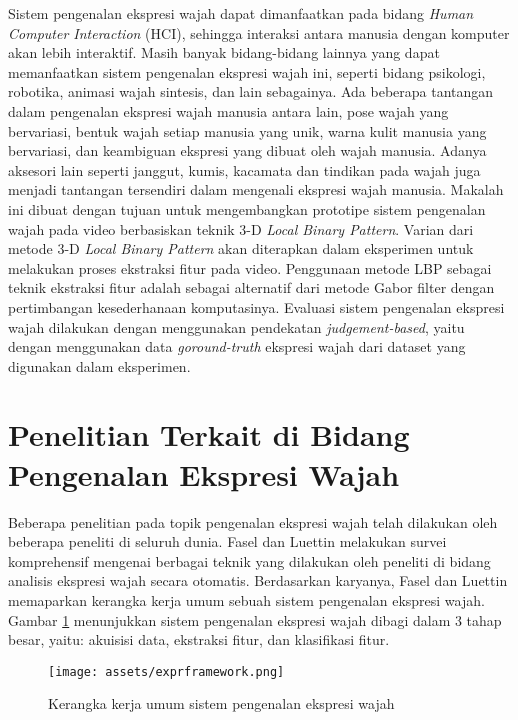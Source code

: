 \documentclass[review,3p,12pt,times]{elsarticle}
\begin{document}
Sistem pengenalan ekspresi wajah dapat dimanfaatkan pada bidang \textit{Human Computer Interaction} (HCI), sehingga interaksi antara manusia dengan komputer akan lebih interaktif. Masih banyak bidang-bidang lainnya yang dapat memanfaatkan sistem pengenalan ekspresi wajah ini, seperti bidang psikologi, robotika, animasi wajah sintesis, dan lain sebagainya. Ada beberapa tantangan dalam pengenalan ekspresi wajah manusia antara lain, pose wajah yang bervariasi, bentuk wajah setiap manusia yang unik, warna kulit manusia yang bervariasi, dan keambiguan ekspresi yang dibuat oleh wajah manusia. Adanya aksesori lain seperti janggut, kumis, kacamata dan tindikan pada wajah juga menjadi tantangan tersendiri dalam mengenali ekspresi wajah manusia. Makalah ini dibuat dengan tujuan untuk mengembangkan prototipe sistem pengenalan wajah pada video berbasiskan teknik 3-D \textit{Local Binary Pattern}. Varian dari metode 3-D \textit{Local Binary Pattern} akan diterapkan dalam eksperimen untuk melakukan proses ekstraksi fitur pada video. Penggunaan metode LBP sebagai teknik ekstraksi fitur adalah sebagai alternatif dari metode Gabor filter dengan pertimbangan kesederhanaan komputasinya. Evaluasi sistem pengenalan ekspresi wajah dilakukan dengan menggunakan pendekatan \textit{judgement-based}, yaitu dengan menggunakan data \textit{goround-truth} ekspresi wajah dari dataset yang digunakan dalam eksperimen.


\section{Penelitian Terkait di Bidang Pengenalan Ekspresi Wajah}
\label{related}

Beberapa penelitian pada topik pengenalan ekspresi wajah telah dilakukan oleh beberapa peneliti di seluruh dunia. Fasel dan Luettin \cite{fasel2003automatic} melakukan survei komprehensif mengenai berbagai teknik yang dilakukan oleh peneliti di bidang analisis ekspresi wajah secara otomatis. Berdasarkan karyanya, Fasel dan Luettin memaparkan kerangka kerja umum sebuah sistem pengenalan ekspresi wajah. Gambar \ref{fig:exprframework} menunjukkan sistem pengenalan ekspresi wajah dibagi dalam 3 tahap besar, yaitu: akuisisi data, ekstraksi fitur, dan klasifikasi fitur.

\begin{figure}[hbt!]
\caption{Kerangka kerja umum sistem pengenalan ekspresi wajah \cite{fasel2003automatic}}
\label{fig:exprframework}
\centering
\texttt{[image: assets/exprframework.png]}

\end{figure}
\end{document}

